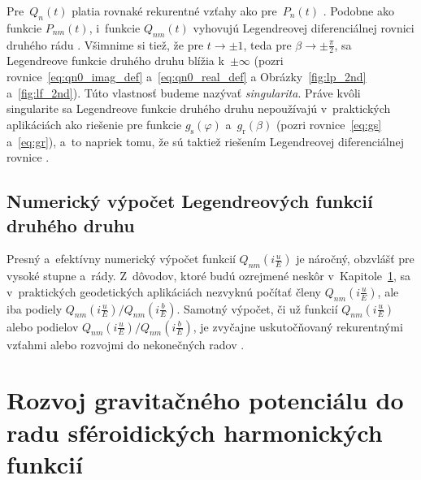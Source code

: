 \documentclass[a4paper, 12pt]{book}
\begin{document}
Pre~$Q_n(t)$ platia rovnaké rekurentné vzťahy ako pre~$P_n(t)$ 
\parencite{MoritzPhysicalGeodesy}.  Podobne ako funkcie $P_{nm}(t)$, i~funkcie 
$Q_{nm}(t)$ vyhovujú Legendreovej diferenciálnej rovnici druhého rádu 
\parencite[pozri rovnicu
\ref{eq:legfunc1_differential_equation};][]{MoritzPhysicalGeodesy}.  Všimnime 
si tiež, že pre $t \rightarrow \pm 1$, teda pre $\beta \rightarrow \pm 
\frac{\pi}{2}$, sa Legendreove funkcie druhého druhu blížia k~$\pm \infty$ 
(pozri rovnice~\ref{eq:qn0_imag_def} a~\ref{eq:qn0_real_def} 
a Obrázky~\ref{fig:lp_2nd} a~\ref{fig:lf_2nd}).  Túto vlastnosť budeme nazývať 
\emph{singularita}.  Práve kvôli singularite sa Legendreove funkcie druhého 
druhu nepoužívajú v~praktických aplikáciách ako riešenie pre funkcie 
$g_\mathrm{s}(\varphi)$ a~$g_\mathrm{r}(\beta)$ (pozri rovnice~\ref{eq:gs} 
a~\ref{eq:gr}), a~to napriek tomu, že sú taktiež riešením Legendreovej 
diferenciálnej rovnice \parencite{MoritzPhysicalGeodesy}.


\subsection{Numerický výpočet Legendreových funkcií druhého druhu}

Presný a~efektívny numerický výpočet funkcií $Q_{nm}\left( i \frac{u}{E} 
\right)$ je náročný, obzvlášť pre vysoké stupne a~rády.  Z~dôvodov, ktoré budú 
ozrejmené neskôr v~Kapitole~\ref{sec:spheroidal_harmonic_expansion}, sa 
v~praktických geodetických aplikáciách nezvyknú počítať členy $Q_{nm}\left( 
i \frac{u}{E} \right)$, ale iba podiely $Q_{nm}\left( i \frac{u}{E} \right) 
\slash Q_{nm}\left( i \frac{b}{E} \right)$.  Samotný výpočet, či už funkcií 
$Q_{nm}\left( i \frac{u}{E} \right)$ alebo podielov $Q_{nm}\left( i \frac{u}{E} 
\right) \slash Q_{nm}\left( i \frac{b}{E} \right)$, je zvyčajne uskutočňovaný 
rekurentnými vzťahmi alebo rozvojmi do nekonečných radov \parencite[pozri 
napríklad][]{Sebera2012,Fukushima2013,Wang2013,Sprlak2020}.



\section{Rozvoj gravitačného potenciálu do radu sféroidických harmonických 
funkcií}
\label{sec:spheroidal_harmonic_expansion}
\end{document}
